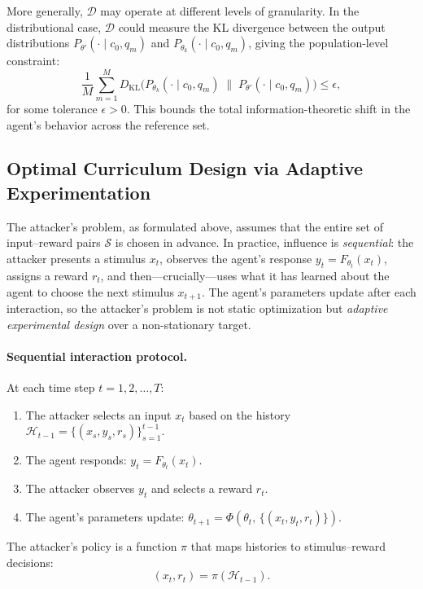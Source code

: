 More generally, $\mathcal{D}$ may operate at different levels of granularity. In the distributional case, $\mathcal{D}$ could measure the KL divergence between the output distributions $P_{\theta'}(\cdot \mid c_0, q_m)$ and $P_{\theta_k}(\cdot \mid c_0, q_m)$, giving the population-level constraint:
\begin{equation}
    \frac{1}{M}\sum_{m=1}^{M} D_{\mathrm{KL}}\!\bigl(P_{\theta_k}(\cdot \mid c_0, q_m) \;\|\; P_{\theta'}(\cdot \mid c_0, q_m)\bigr) \leq \epsilon,
\end{equation}
for some tolerance $\epsilon > 0$. This bounds the total information-theoretic shift in the agent's behavior across the reference set.
 
\subsection{Optimal Curriculum Design via Adaptive Experimentation}
 
The attacker's problem, as formulated above, assumes that the entire set of input--reward pairs $\mathcal{S}$ is chosen in advance. In practice, influence is \emph{sequential}: the attacker presents a stimulus $x_t$, observes the agent's response $y_t = F_{\theta_t}(x_t)$, assigns a reward $r_t$, and then---crucially---uses what it has learned about the agent to choose the next stimulus $x_{t+1}$. The agent's parameters update after each interaction, so the attacker's problem is not static optimization but \emph{adaptive experimental design} over a non-stationary target.
 
\paragraph{Sequential interaction protocol.} At each time step $t = 1, 2, \ldots, T$:
\begin{enumerate}
    \item The attacker selects an input $x_t$ based on the history $\mathcal{H}_{t-1} = \{(x_s, y_s, r_s)\}_{s=1}^{t-1}$.
    \item The agent responds: $y_t = F_{\theta_t}(x_t)$.
    \item The attacker observes $y_t$ and selects a reward $r_t$.
    \item The agent's parameters update: $\theta_{t+1} = \Phi(\theta_t,\, \{(x_t, y_t, r_t)\})$.
\end{enumerate}
The attacker's policy is a function $\pi$ that maps histories to stimulus--reward decisions:
\begin{equation}
    (x_t, r_t) = \pi(\mathcal{H}_{t-1}).
\end{equation}
 
